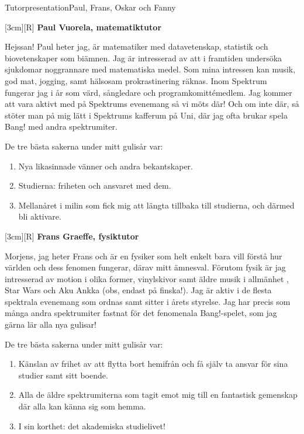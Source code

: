 \documentclass{spektraklet}
\begin{document}
\begin{artikel}{Tutorpresentation}{Paul, Frans, Oskar och Fanny}



[3cm][R]
\textbf{Paul Vuorela, matematiktutor}

Hejssan! Paul heter jag, är matematiker med datavetenskap, statistik och biovetenskaper som biämnen. Jag är intresserad av att i framtiden undersöka sjukdomar noggrannare med matematiska medel. Som mina intressen kan musik, god mat, jogging, samt hälsosam prokrastinering räknas. Inom Spektrum fungerar jag i år som värd, sångledare och programkomittémedlem. Jag kommer att vara aktivt med på Spektrums evenemang så vi möts där! Och om inte där, så stöter man på mig lätt i Spektrums kafferum på Uni, där jag ofta brukar spela Bang! med andra spektrumiter.

De tre bästa sakerna under mitt gulisår var:
\begin{enumerate}
\item Nya likasinnade vänner och andra bekantskaper.
\item Studierna: friheten och ansvaret med dem.
\item Mellanåret i milin som fick mig att längta tillbaka till studierna, och därmed bli aktivare.
\end{enumerate}


[3cm][R]
\textbf{Frans Graeffe, fysiktutor}

Morjens, jag heter Frans och är en fysiker som helt enkelt bara 
vill förstå hur världen och dess fenomen fungerar, därav mitt ämnesval. Förutom fysik är jag intresserad av motion i olika former, vinylskivor samt äldre musik i allmänhet , Star Wars och Aku Ankka (obs, endast på finska!). Jag är aktiv i de flesta spektrala evenemang som ordnas samt sitter i årets styrelse. Jag har precis som många andra spektrumiter fastnat för det fenomenala Bang!-spelet, som jag gärna lär alla nya gulisar!

De tre bästa sakerna under mitt gulisår var:
\begin{enumerate}
\item Känslan av frihet av att flytta bort hemifrån och få själv ta ansvar för sina studier samt sitt boende.
\item Alla de äldre spektrumiterna som tagit emot mig till en fantastisk gemenskap där alla kan känna sig som hemma.
\item I sin korthet: det akademiska studielivet!
\end{enumerate}


\end{artikel}
\end{document}
